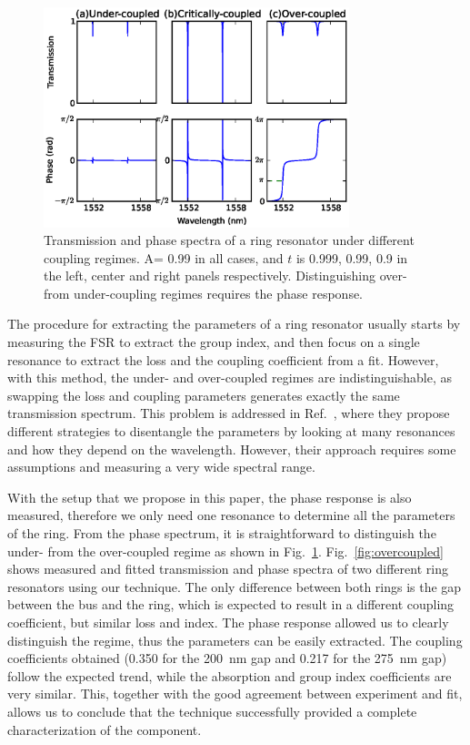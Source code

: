 \documentclass[journal]{IEEEtran}
\begin{document}
 

\begin{figure}[htb]
    \centering
    \includegraphics[width=3.5in]{ringCouplingRegimes}
    \caption{Transmission and phase spectra of a ring resonator under different coupling regimes.
    A= 0.99 in all cases, and $t$ is 0.999, 0.99, 0.9 in the left, center and right panels respectively.
    Distinguishing over- from under-coupling regimes requires the phase response.}
    \label{fig:ringDifferentCoupling}
\end{figure}



The procedure for extracting the parameters of a ring resonator usually starts by measuring the FSR to extract the group index, and then focus on a single resonance to extract the loss and the coupling coefficient from a fit.
However, with this method, the under- and over-coupled regimes are indistinguishable, as swapping the loss and coupling parameters generates exactly the same transmission spectrum.
This problem is addressed in Ref.~\cite{McKinnon2009}, where they propose different strategies to disentangle the parameters by looking at many resonances and how they depend on the wavelength.
However, their approach requires some assumptions and measuring a very wide spectral range.
 
With the setup that we propose in this paper, the phase response is also measured, therefore we only need one resonance to determine all the parameters of the ring.
From the phase spectrum, it is straightforward to distinguish the under- from the over-coupled regime as shown in Fig.~\ref{fig:ringDifferentCoupling}.
Fig.~\ref{fig:overcoupled} shows measured and fitted transmission and phase spectra of two different ring resonators using our technique.
The only difference between both rings is the gap between the bus and the ring, which is expected to result in a different coupling coefficient, but similar loss and index.
The phase response allowed us to clearly distinguish the regime, thus the parameters can be easily extracted.
The coupling coefficients obtained (0.350 for the 200~nm gap and 0.217 for the 275~nm gap) follow the expected trend, while the absorption and group index coefficients are very similar.
This, together with the good agreement between experiment and fit, allows us to conclude that the technique successfully provided a complete characterization of the component.
\end{document}
